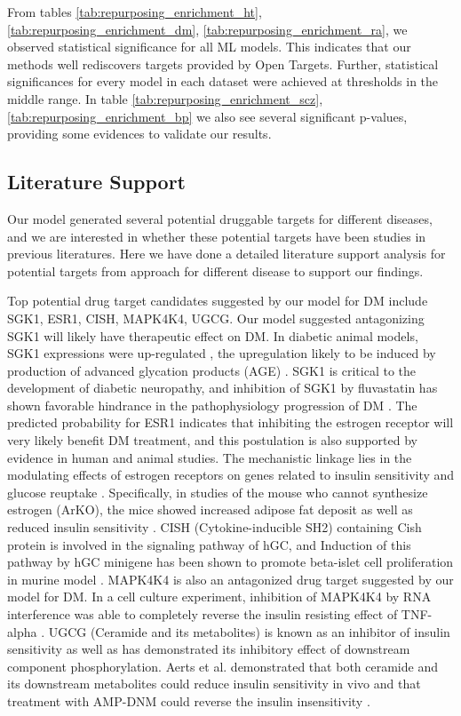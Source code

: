    From tables \ref{tab:repurposing_enrichment_ht}, \ref{tab:repurposing_enrichment_dm}, \ref{tab:repurposing_enrichment_ra}, we observed statistical significance for all ML models. This indicates that our methods well rediscovers targets provided by Open Targets. Further, statistical significances for every model in each dataset were achieved at thresholds in the middle range. In table \ref{tab:repurposing_enrichment_scz}, \ref{tab:repurposing_enrichment_bp} we also see several significant p-values, providing some evidences to validate our results.

  \subsection{Literature Support}
    Our model generated several potential druggable targets for different diseases, and we are interested in whether these potential targets have been studies in previous literatures. Here we have done a detailed literature support analysis for potential targets from approach for different disease to support our findings. 

    Top potential drug target candidates suggested by our model for DM include SGK1, ESR1, CISH, MAPK4K4, UGCG. Our model suggested antagonizing SGK1 will likely have therapeutic effect on DM. In diabetic animal models, SGK1 expressions were up-regulated \cite{hills2006high, xuebin2005expression,chang2007enhancement}, the upregulation likely to be induced by production of advanced glycation products (AGE) \cite{hills2006high,chang2007enhancement}. SGK1 is critical to the development of diabetic neuropathy, and inhibition of SGK1 by fluvastatin has shown favorable hindrance in the pathophysiology progression of DM \cite{xuebin2005expression}. The predicted probability for ESR1 indicates that inhibiting the estrogen receptor will very likely benefit DM treatment, and this postulation is also supported by evidence in human \cite{barros2006estrogen} and animal \cite{weigt2015effects} studies. The mechanistic linkage lies in the modulating effects of estrogen receptors on genes related to insulin sensitivity and glucose reuptake \cite{barros2006estrogen}. Specifically, in studies of the mouse who cannot synthesize estrogen (ArKO), the mice showed increased adipose fat deposit as well as reduced insulin sensitivity \cite{jones2000aromatase,takeda2003progressive}. CISH (Cytokine-inducible SH2) containing Cish protein is involved in the signaling pathway of hGC, and Induction of this pathway by hGC minigene has been shown to promote beta-islet cell proliferation in murine model \cite{baan2015transgenic}. MAPK4K4 is also an antagonized drug target suggested by our model for DM. In a cell culture experiment, inhibition of MAPK4K4 by RNA interference was able to completely reverse the insulin resisting effect of TNF-alpha \cite{bouzakri2007map4k4}. UGCG (Ceramide and its metabolites) is known as an inhibitor of insulin sensitivity as well as has demonstrated its inhibitory effect of downstream component phosphorylation. Aerts et al. demonstrated that both ceramide and its downstream metabolites could reduce insulin sensitivity in vivo and that treatment with AMP-DNM could reverse the insulin insensitivity \cite{aerts2007pharmacological}. 
  
